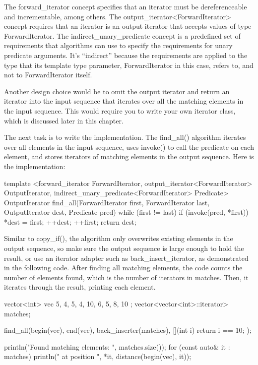 The forward\_iterator concept specifies that an iterator must be dereferenceable and incrementable, among others. The output\_iterator<ForwardIterator> concept requires that an iterator is an output iterator that accepts values of type ForwardIterator. The indirect\_unary\_predicate concept is a predefined set of requirements that algorithms can use to specify the requirements for unary predicate arguments. It’s “indirect” because the requirements are applied to the type that its template type parameter, ForwardIterator in this case, refers to, and not to ForwardIterator itself.

Another design choice would be to omit the output iterator and return an iterator into the input sequence that iterates over all the matching elements in the input sequence. This would require you to write your own iterator class, which is discussed later in this chapter.

The next task is to write the implementation. The find\_all() algorithm iterates over all elements in the input sequence, uses invoke() to call the predicate on each element, and stores iterators of matching elements in the output sequence. Here is the implementation:

\begin{cpp}
template <forward_iterator ForwardIterator,
          output_iterator<ForwardIterator> OutputIterator,
          indirect_unary_predicate<ForwardIterator> Predicate>
OutputIterator find_all(ForwardIterator first, ForwardIterator last,
                        OutputIterator dest, Predicate pred)
{
    while (first != last) {
        if (invoke(pred, *first)) {
            *dest = first;
            ++dest;
        }
        ++first;
    }
    return dest;
}
\end{cpp}

Similar to copy\_if(), the algorithm only overwrites existing elements in the output sequence, so make sure the output sequence is large enough to hold the result, or use an iterator adapter such as back\_insert\_iterator, as demonstrated in the following code. After finding all matching elements, the code counts the number of elements found, which is the number of iterators in matches. Then, it iterates through the result, printing each element.

\begin{cpp}
vector<int> vec { 5, 4, 5, 4, 10, 6, 5, 8, 10 };
vector<vector<int>::iterator> matches;

find_all(begin(vec), end(vec), back_inserter(matches),
    [](int i){ return i == 10; });

println("Found {} matching elements: ", matches.size());
for (const auto& it : matches) {
    println("{} at position {}", *it, distance(begin(vec), it));
}
\end{cpp}

